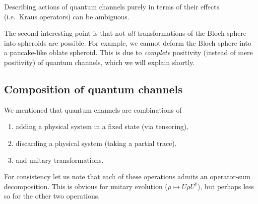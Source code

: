 \documentclass[fleqn]{article}
\providecommand{\tightlist}{%
  \setlength{\itemsep}{0pt}\setlength{\parskip}{0pt}}
\newenvironment{idea}{\noindent}{\medskip}
\begin{document}
\begin{idea}
Describing actions of quantum channels purely in terms of their effects (i.e.~Kraus operators) can be ambiguous.

\end{idea}

The second interesting point is that not \emph{all} transformations of the Bloch sphere into spheroids are possible.
For example, we cannot deform the Bloch sphere into a pancake-like oblate spheroid.
This is due to \emph{complete} positivity (instead of mere positivity) of quantum channels, which we will explain shortly.

\hypertarget{composition-of-quantum-channels}{%
\subsection{Composition of quantum channels}\label{composition-of-quantum-channels}}

We mentioned that quantum channels are combinations of

\begin{enumerate}
\def\labelenumi{\arabic{enumi}.}
\tightlist
\item
  adding a physical system in a fixed state (via tensoring),
\item
  discarding a physical system (taking a partial trace),
\item
  and unitary transformations.
\end{enumerate}

For consistency let us note that each of these operations admits an operator-sum decomposition. This is obvious for unitary evolution (\(\rho\mapsto U\rho U^\dagger\)), but perhaps less so for the other two operations.
\end{document}
